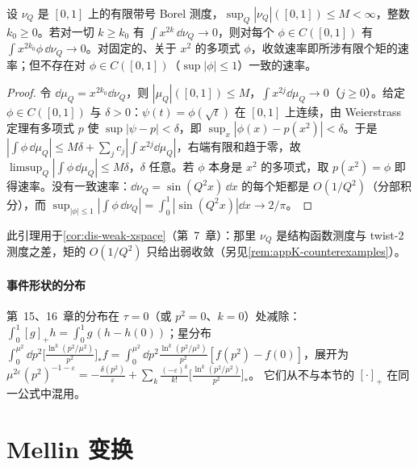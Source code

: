 \begin{lemma}[由偶数矩得到弱收敛]\label{lem:appA-weak-convergence}
设 $\nu_Q$ 是 $[0,1]$ 上的有限带号 Borel 测度，$\sup_Q|\nu_Q|([0,1])\le M<\infty$，整数 $k_0\ge0$。若对一切 $k\ge k_0$ 有 $\int x^{2k}\,\dd\nu_Q\to0$，则对每个 $\phi\in C([0,1])$ 有 $\int x^{2k_0}\phi\,\dd\nu_Q\to0$。对固定的、关于 $x^2$ 的多项式 $\phi$，收敛速率即所涉有限个矩的速率；但不存在对 $\phi\in C([0,1])$（$\sup|\phi|\le1$）一致的速率。
\end{lemma}

\begin{proof}
令 $\dd\mu_Q=x^{2k_0}\dd\nu_Q$，则 $|\mu_Q|([0,1])\le M$，$\int x^{2j}\dd\mu_Q\to0$（$j\ge0$）。给定 $\phi\in C([0,1])$ 与 $\delta>0$：$\psi(t)=\phi(\sqrt t)$ 在 $[0,1]$ 上连续，由 Weierstrass 定理有多项式 $p$ 使 $\sup|\psi-p|<\delta$，即 $\sup_x|\phi(x)-p(x^2)|<\delta$。于是 $|\int\phi\,\dd\mu_Q|\le M\delta+\sum_jc_j|\int x^{2j}\dd\mu_Q|$，右端有限和趋于零，故 $\limsup_Q|\int\phi\,\dd\mu_Q|\le M\delta$，$\delta$ 任意。若 $\phi$ 本身是 $x^2$ 的多项式，取 $p(x^2)=\phi$ 即得速率。没有一致速率：$\dd\nu_Q=\sin(Q^2x)\,\dd x$ 的每个矩都是 $O(1/Q^2)$（分部积分），而 $\sup_{|\phi|\le1}|\int\phi\,\dd\nu_Q|=\int_0^1|\sin(Q^2x)|\dd x\to2/\pi$。
\end{proof}

此引理用于\cref{cor:dis-weak-xspace}（第~7~章）：那里 $\nu_Q$ 是结构函数测度与 twist-2 测度之差，矩的 $O(1/Q^2)$ 只给出弱收敛（另见\cref{rem:appK-counterexamples}）。

\paragraph{事件形状的分布}
第~15、16~章的分布在 $\tau=0$（或 $p^2=0$、$k=0$）处减除：$\int_0^1[g]_+h=\int_0^1g\,(h-h(0))$；星分布 $\int_0^{\mu^2}\dd p^2\big[\frac{\ln^k(p^2/\mu^2)}{p^2}\big]_*f=\int_0^{\mu^2}\dd p^2\frac{\ln^k(p^2/\mu^2)}{p^2}[f(p^2)-f(0)]$，展开为 $\mu^{2\varepsilon}(p^2)^{-1-\varepsilon}=-\frac{\delta(p^2)}{\varepsilon}+\sum_k\frac{(-\varepsilon)^k}{k!}\big[\frac{\ln^k(p^2/\mu^2)}{p^2}\big]_*$。%
它们从不与本节的 $[\cdot]_+$ 在同一公式中混用。

\section{Mellin 变换}\label{sec:appA-mellin}

